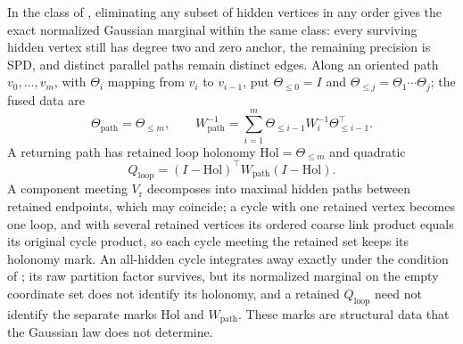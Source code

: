 In the class of , eliminating any subset of
hidden vertices in any order gives the exact normalized Gaussian marginal within
the same class: every surviving hidden vertex still has degree two and zero
anchor, the remaining precision is SPD, and distinct parallel paths remain
distinct edges. Along an oriented path \(v_0,\ldots,v_m\), with \(\Theta_i\)
mapping from \(v_i\) to \(v_{i-1}\), put \(\Theta_{\leq0}=I\) and
\(\Theta_{\leq j}=\Theta_1\cdots\Theta_j\); the fused data are
\begin{equation}
\Theta_{\mathrm{path}}=\Theta_{\leq m},\qquad
W_{\mathrm{path}}^{-1}
=\sum_{i=1}^m\Theta_{\leq i-1}W_i^{-1}\Theta_{\leq i-1}^\top .
\label{eq:cg-nonflat-path-formula}
\end{equation}
A returning path has retained loop holonomy \(\mathrm{Hol}=\Theta_{\leq m}\)
and quadratic
\begin{equation}
Q_{\mathrm{loop}}=(I-\mathrm{Hol})^\top W_{\mathrm{path}}(I-\mathrm{Hol}).
\label{eq:cg-nonflat-retained-loop}
\end{equation}
A component meeting \(V_{\mathrm r}\) decomposes into maximal hidden paths
between retained endpoints, which may coincide; a cycle with one retained vertex
becomes one loop, and with several retained vertices its ordered coarse link
product equals its original cycle product, so each cycle meeting the retained
set keeps its holonomy mark. An all-hidden cycle integrates away exactly under
the condition of ; its raw partition
factor survives, but its normalized marginal on the empty coordinate set does
not identify its holonomy, and a retained \(Q_{\mathrm{loop}}\) need not
identify the separate marks \(\mathrm{Hol}\) and \(W_{\mathrm{path}}\). These
marks are structural data that the Gaussian law does not determine.


